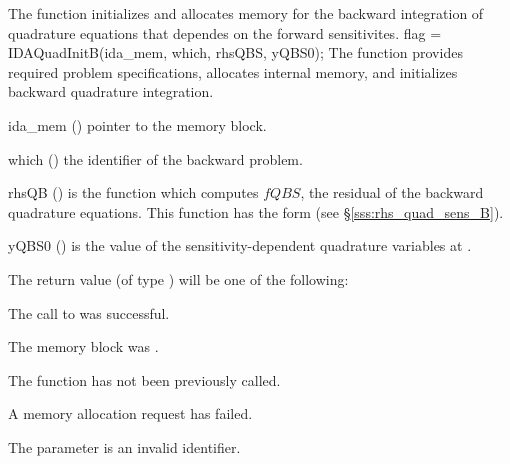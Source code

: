 The function  initializes and allocates memory for the backward
integration of quadrature equations that dependes on the forward sensitivites.
{
flag = IDAQuadInitB(ida\_mem, which, rhsQBS, yQBS0);
}
{
  The function  provides required problem specifications,
  allocates internal memory, and initializes backward quadrature integration.
}
{
  \begin{args}
  \item[ida\_mem] ()
    pointer to the {\idas} memory block.
  \item[which] ()
    the identifier of the backward problem.
  \item[rhsQB] ()
    is the {\C} function which computes $fQBS$, the residual of the 
    backward quadrature equations. This function has the form 
    (see \S\ref{sss:rhs_quad_sens_B}).
  \item[yQBS0] ()
    is the value of the sensitivity-dependent quadrature variables at .
  \end{args}
}
{
  The return value  (of type ) will be one of the following:
  \begin{args}
  \item[\Id{IDA\_SUCCESS}]
    The call to  was successful.
  \item[\Id{IDA\_MEM\_NULL}] 
    The  memory block was .
  \item[\Id{IDA\_NO\_ADJ}]
    The function  has not been previously called.
  \item[\Id{IDA\_MEM\_FAIL}] 
    A memory allocation request has failed.
  \item[\Id{IDA\_ILL\_INPUT}]
    The parameter  is an invalid identifier.
  \end{args}
}
{}


